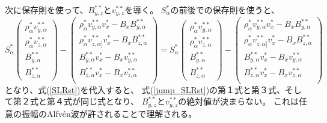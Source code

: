 次に保存則を使って、$B^{**}_{y,z}$と$v^{**}_{y,z}$を導く。
$S^*_\alpha$の前後での保存則を使うと、
\begin{equation}
S_\mathrm{\alpha}^*
    \left(
    \begin{array}{c}
       \rho_\alpha^* v^{**}_{y,\alpha}\\
       \rho_\alpha^* v^{**}_{z,\alpha} \\
       B^{**}_{y,\alpha} \\
       B^{**}_{z,\alpha} 
    \end{array}
    \right)
    - 
    \left(
    \begin{array}{c}
       \rho_\alpha^* v^{**}_{y,\alpha} v^*_{x} - B_x B^{**}_{y,\alpha}\\
       \rho_\alpha^* v^{**}_{z,\alpha]} v^*_{x} - B_x B^{**}_{z,\alpha}\\
       B^{**}_{y,\alpha} v^*_x - B_x v^{**}_{y,\alpha} \\
       B^{**}_{z,\alpha} v^*_x - B_x v^{**}_{z,\alpha} \\
    \end{array}
    \right)
    = S^*_\alpha
    \left(
    \begin{array}{c}
       \rho_\alpha^* v^{**}_{y,\alpha}\\
       \rho_\alpha^* v^{**}_{z,\alpha} \\
       B^{**}_{y,\alpha} \\
       B^{**}_{z,\alpha} 
    \end{array}
    \right)
    - 
    \left(
    \begin{array}{c}
       \rho_\alpha^* v^{**}_{y,\alpha} v^*_{x} - B_x B^{**}_{y,\alpha}\\
       \rho_\alpha^* v^{**}_{z,\alpha]} v^*_{x} - B_x B^{**}_{z,\alpha}\\
       B^{**}_{y,\alpha} v^*_x - B_x v^{**}_{y,\alpha} \\
       B^{**}_{z,\alpha} v^*_x - B_x v^{**}_{z,\alpha} \\
    \end{array}
    \right)
    \label{jump_SLRst}
\end{equation}
となり、式(\ref{SLRst})を代入すると、
式(\ref{jump_SLRst})の第１式と第３式、そして第２式と第４式が同じ式となり、
$B^{**}_{y,z}$と$v^{**}_{y,z}$の絶対値が決まらない。
これは任意の振幅のAlfv\'en波が許されることで理解される。

